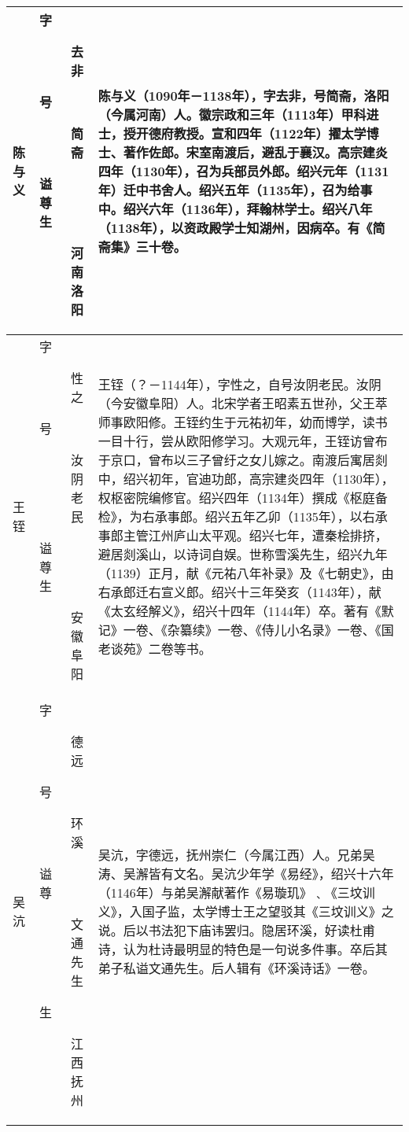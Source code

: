 \begin{longtable}{|>{\centering\namefont\heiti}m{2em}|>{\centering\tiny}m{3.0em}|>{\xzfont\kaiti}m{7em}|}
  陈与义 & \begin{description}
  \item[字] 去非
  \item[号] 简斋
  \item[谥] 
  \item[尊] 
  \item[生] 河南洛阳
  \end{description} & 陈与义（1090年－1138年），字去非，号简斋，洛阳（今属河南）人。徽宗政和三年（1113年）甲科进士，授开德府教授。宣和四年（1122年）擢太学博士、著作佐郎。宋室南渡后，避乱于襄汉。高宗建炎四年（1130年），召为兵部员外郎。绍兴元年（1131年）迁中书舍人。绍兴五年（1135年），召为给事中。绍兴六年（1136年），拜翰林学士。绍兴八年（1138年），以资政殿学士知湖州，因病卒。有《简斋集》三十卷。 \tabularnewline\hline
  王铚 & \begin{description}
  \item[字] 性之
  \item[号] 汝阴老民
  \item[谥] 
  \item[尊] 
  \item[生] 安徽阜阳
  \end{description} & 王铚（？－1144年），字性之，自号汝阴老民。汝阴（今安徽阜阳）人。北宋学者王昭素五世孙，父王萃师事欧阳修。王铚约生于元祐初年，幼而博学，读书一目十行，尝从欧阳修学习。大观元年，王铚访曾布于京口，曾布以三子曾纡之女儿嫁之。南渡后寓居剡中，绍兴初年，官迪功郎，高宗建炎四年（1130年），权枢密院编修官。绍兴四年（1134年）撰成《枢庭备检》，为右承事郎。绍兴五年乙卯（1135年），以右承事郎主管江州庐山太平观。绍兴七年，遭秦桧排挤，避居剡溪山，以诗词自娱。世称雪溪先生，绍兴九年（1139）正月，献《元祐八年补录》及《七朝史》，由右承郎迁右宣义郎。绍兴十三年癸亥（1143年），献《太玄经解义》，绍兴十四年（1144年）卒。著有《默记》一卷、《杂纂续》一卷、《侍儿小名录》一卷、《国老谈苑》二卷等书。 \tabularnewline\hline
  吴沆 & \begin{description}
  \item[字] 德远
  \item[号] 环溪
  \item[谥] 
  \item[尊] 文通先生
  \item[生] 江西抚州
  \end{description} & 吴沆，字德远，抚州崇仁（今属江西）人。兄弟吴涛、吴澥皆有文名。吴沆少年学《易经》，绍兴十六年（1146年）与弟吴澥献著作《易璇玑》﹑《三坟训义》，入国子监，太学博士王之望驳其《三坟训义》之说。后以书法犯下庙讳罢归。隐居环溪，好读杜甫诗，认为杜诗最明显的特色是一句说多件事。卒后其弟子私谥文通先生。后人辑有《环溪诗话》一卷。 \tabularnewline\hline

\end{longtable}
